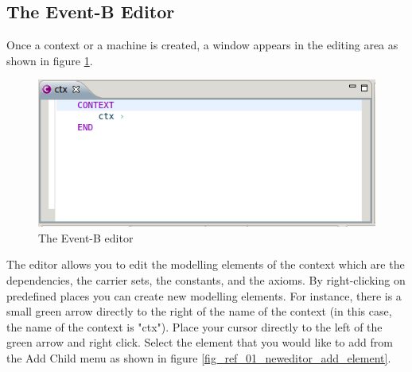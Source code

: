 \subsection{The Event-B Editor}
\label{new_eventb_editor}

Once a context or a machine is created, a window appears in the editing area as shown in figure \ref{fig_ref_01_eventb_editor1_neweditor}.


\begin{figure}[!ht]
\begin{center}
	\includegraphics{img/reference/ref_01_eventb_editor1_neweditor.png}
	\caption{The Event-B editor}
	\label{fig_ref_01_eventb_editor1_neweditor}
\end{center}
\end{figure}

The editor allows you to edit the modelling elements of the context which are the dependencies, the carrier sets, the constants, and the axioms. By right-clicking on predefined places you can create new modelling elements. For instance, there is a small green arrow directly to the right of the name of the context (in this case, the name of the context is "ctx"). Place your cursor directly to the left of the green arrow and right click. Select the element that you would like to add from the \textsf{Add Child} menu as shown in figure \ref{fig_ref_01_neweditor_add_element}.


